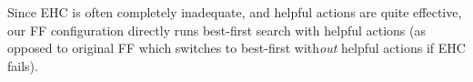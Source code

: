 Since EHC is often completely inadequate, and helpful actions are
quite effective, our FF configuration directly runs best-first search
with helpful actions (as opposed to original FF which switches to
best-first with{\em out} helpful actions if EHC fails).










